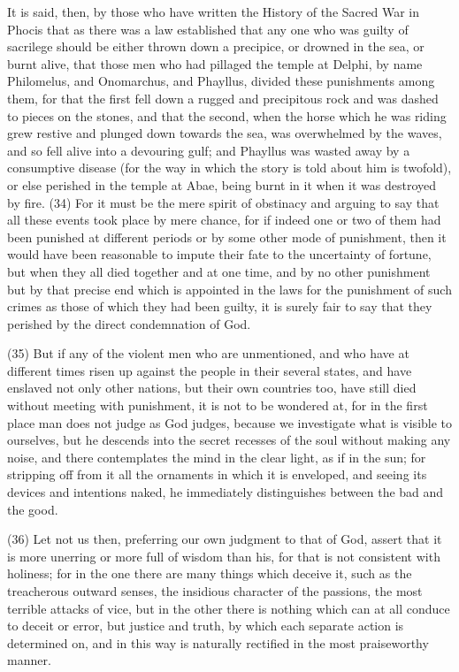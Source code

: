 It is said, then, by those who have written the History of the Sacred War in Phocis that as there
was a law established that any one who was guilty of sacrilege should be either thrown down a
precipice, or drowned in the sea, or burnt alive, that those men who had pillaged the temple at
Delphi, by name Philomelus, and Onomarchus, and Phayllus, divided these punishments among
them, for that the first fell down a rugged and precipitous rock and was dashed to pieces on the
stones, and that the second, when the horse which he was riding grew restive and plunged down
towards the sea, was overwhelmed by the waves, and so fell alive into a devouring gulf; and
Phayllus was wasted away by a consumptive disease (for the way in which the story is told about
him is twofold), or else perished in the temple at Abae, being burnt in it when it was destroyed by
fire. (34) For it must be the mere spirit of obstinacy and arguing to say that all these events took
place by mere chance, for if indeed one or two of them had been punished at different periods or
by some other mode of punishment, then it would have been reasonable to impute their fate to the
uncertainty of fortune, but when they all died together and at one time, and by no other punishment
but by that precise end which is appointed in the laws for the punishment of such crimes as those
of which they had been guilty, it is surely fair to say that they perished by the direct condemnation
of God.

(35) But if any of the violent men who are unmentioned, and who have at different times risen up
against the people in their several states, and have enslaved not only other nations, but their own
countries too, have still died without meeting with punishment, it is not to be wondered at, for in the
first place man does not judge as God judges, because we investigate what is visible to ourselves,
but he descends into the secret recesses of the soul without making any noise, and there
contemplates the mind in the clear light, as if in the sun; for stripping off from it all the ornaments in
which it is enveloped, and seeing its devices and intentions naked, he immediately distinguishes
between the bad and the good.

(36) Let not us then, preferring our own judgment to that of God, assert that it is more unerring or
more full of wisdom than his, for that is not consistent with holiness; for in the one there are many
things which deceive it, such as the treacherous outward senses, the insidious character of the
passions, the most terrible attacks of vice, but in the other there is nothing which can at all conduce
to deceit or error, but justice and truth, by which each separate action is determined on, and in this
way is naturally rectified in the most praiseworthy manner.

